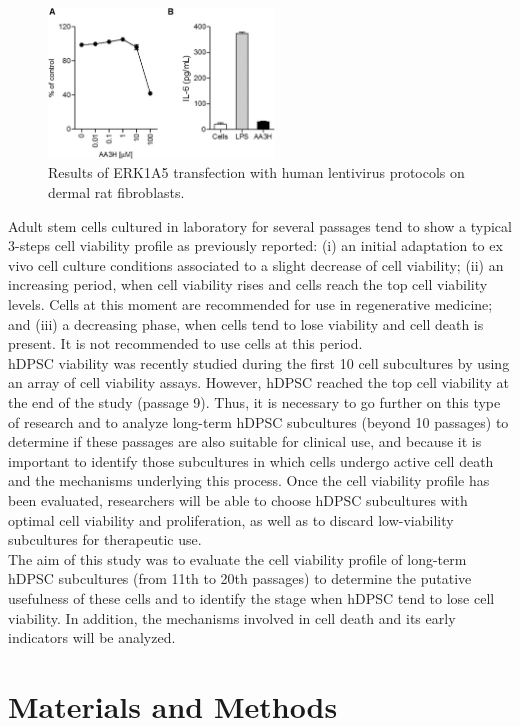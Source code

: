 \documentclass[a4paper,12pt]{article}
\begin{document}
\begin{center}
\begin{figure}
\includegraphics[width=6cm]{fig1}
\caption{Results of ERK1A5 transfection with human lentivirus protocols on dermal rat fibroblasts.}
\label{Figure 1}
\end{figure}
\end{center}

Adult stem cells cultured in laboratory for several passages tend to show a typical 3-steps cell viability profile as previously reported: (i) an initial adaptation to ex vivo cell culture conditions associated to a slight decrease of cell viability; (ii) an increasing  period, when cell viability rises and cells reach the top cell viability levels. Cells at this moment are recommended for use in regenerative medicine; and (iii) a decreasing phase, when cells tend to lose viability and cell death is present. It is not recommended to use cells at this period.\\
hDPSC viability was recently studied during the first 10 cell subcultures by using an array of cell viability assays. However, hDPSC reached the top cell viability at the end of the study (passage 9). Thus, it is necessary to go further on this type of research and to analyze long-term hDPSC subcultures (beyond 10 passages) to determine if these passages are also suitable for clinical use, and because it is important to identify those subcultures in which cells undergo active cell death and the mechanisms underlying this process. Once the cell viability profile has been evaluated, researchers will be able to choose hDPSC subcultures with optimal cell viability and proliferation, as well as to discard low-viability subcultures for therapeutic use.\\
The aim of this study was to evaluate the cell viability profile of long-term hDPSC subcultures (from 11th to 20th passages) to determine the putative usefulness of these cells and to identify the stage when hDPSC tend to lose cell viability. In addition, the mechanisms involved in cell death and its early indicators will be analyzed.
\section{Materials and Methods}
\end{document}

